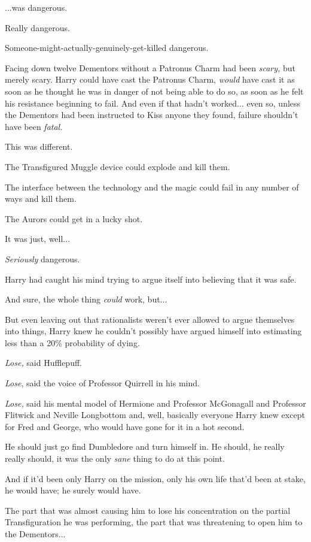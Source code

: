 ...was dangerous.

Really dangerous.

Someone-might-actually-genuinely-get-killed dangerous.

Facing down twelve Dementors without a Patronus Charm had been \emph{scary,} but merely scary. Harry could have cast the Patronus Charm, \emph{would} have cast it as soon as he thought he was in danger of not being able to do so, as soon as he felt his resistance beginning to fail. And even if that hadn't worked... even so, unless the Dementors had been instructed to Kiss anyone they found, failure shouldn't have been \emph{fatal.}

This was different.

The Transfigured Muggle device could explode and kill them.

The interface between the technology and the magic could fail in any number of ways and kill them.

The Aurors could get in a lucky shot.

It was just, well...

\emph{Seriously} dangerous.

Harry had caught his mind trying to argue itself into believing that it was safe.

And sure, the whole thing \emph{could} work, but...

But even leaving out that rationalists weren't ever allowed to argue themselves into things, Harry knew he couldn't possibly have argued himself into estimating less than a 20\% probability of dying.

\emph{Lose,} said Hufflepuff.

\emph{Lose}, said the voice of Professor Quirrell in his mind.

\emph{Lose,} said his mental model of Hermione and Professor McGonagall and Professor Flitwick and Neville Longbottom and, well, basically everyone Harry knew except for Fred and George, who would have gone for it in a hot second.

He should just go find Dumbledore and turn himself in. He should, he really really should, it was the only \emph{sane} thing to do at this point.

And if it'd been only Harry on the mission, only his own life that'd been at stake, he would have; he surely would have.

The part that was almost causing him to lose his concentration on the partial Transfiguration he was performing, the part that was threatening to open him to the Dementors...

